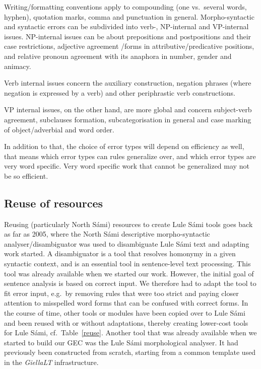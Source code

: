 \documentclass[free]{flammie}
\begin{document}
Writing/formatting conventions apply to compounding (one vs.\ several words,
hyphen), quotation marks, comma and punctuation in general.  Morpho-syntactic
and syntactic errors can be subdivided into verb-, NP-internal and VP-internal
issues.  NP-internal issues can be about prepositions and postpositions and
their case restrictions, adjective agreement /forms in attributive/predicative
positions, and relative pronoun agreement with its anaphora in number, gender
and animacy.

Verb internal issues concern the auxiliary construction, negation phrases (where
negation is expressed by  a verb) and other periphrastic verb constructions.

VP internal issues, on the other hand, are more global and concern subject-verb
agreement, subclauses formation, subcategorisation in general and case marking
of object/adverbial and word order.

In addition to that, the choice of error types will depend on efficiency as
well, that means which error types can rules generalize over, and which error
types are very word specific.  Very word specific work that cannot be
generalized may not be so efficient.

\subsection{Reuse of resources}

Reusing (particularly North Sámi) resources to create Lule Sámi tools goes back
as far as 2005, where the North Sámi descriptive morpho-syntactic
analyser/disambiguator was used to disambiguate Lule Sámi text and adapting work
started.  A disambiguator is a tool that resolves homonymy in a given syntactic
context, and is an essential tool in sentence-level text processing. This tool
was already available when we started our work. However, the initial goal of
sentence analysis is based on correct input. We therefore had to adapt the tool
to fit error input, e.g.\ by removing rules that were too strict and paying
closer attention to misspelled word forms that can be confused  with  correct
forms. In the course of time, other tools or modules have been copied over to
Lule Sámi and been reused with or without adaptations, thereby creating
lower-cost tools for Lule Sámi, cf.\ Table~\ref{reuse}.  Another tool that was
already available when we started to build our GEC was the Lule Sámi
morphological analyser. It had previously been constructed from scratch,
starting from a common template used in the \textit{GiellaLT} infrastructure.
\end{document}

